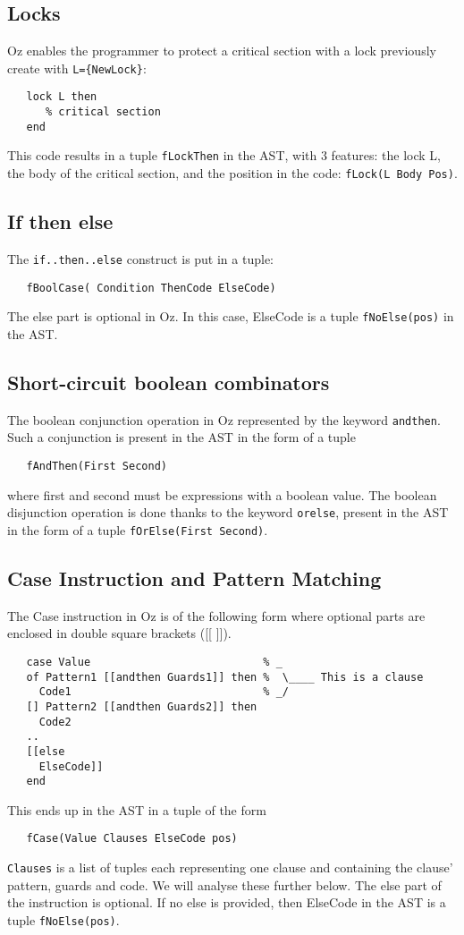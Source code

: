 \documentclass[a4paper]{memoir}
\begin{document}
\subsection{Locks}\label{sec:input:locks}
Oz enables the programmer to protect a critical section with a lock previously create with \lstinline!L={NewLock}!:
\begin{lstlisting}
   lock L then
      % critical section
   end
\end{lstlisting}

This code results in a tuple \lstinline!fLockThen! in the AST, with 3 features: the lock L,
the body of the critical section, and the position in the code:
\lstinline!fLock(L Body Pos)!.

\subsection{If then else}
The \lstinline!if..then..else! construct is put in a tuple:
\begin{lstlisting}
   fBoolCase( Condition ThenCode ElseCode)
\end{lstlisting}
The else part is optional in Oz. In this case, ElseCode is a tuple \lstinline!fNoElse(pos)! in the AST.

\subsection{Short-circuit boolean combinators}\label{sec:input:booleancombinations}
The boolean conjunction operation in Oz represented by the keyword \lstinline!andthen!. Such a conjunction is present in the AST in the form of a tuple 
\begin{lstlisting}
   fAndThen(First Second)
\end{lstlisting}
where first and second must be expressions with a boolean value.
The boolean disjunction operation is done thanks to the keyword \lstinline!orelse!, present in the AST in the form of a tuple \lstinline!fOrElse(First Second)!.

\subsection{Case Instruction and Pattern Matching}\label{sec:input:patternmatching}
The Case instruction in Oz is of the following form where optional parts are enclosed in double square brackets ([[ ]]).
\begin{lstlisting}
   case Value                           % _
   of Pattern1 [[andthen Guards1]] then %  \____ This is a clause
     Code1                              % _/
   [] Pattern2 [[andthen Guards2]] then
     Code2
   ..
   [[else
     ElseCode]]
   end
\end{lstlisting}
This ends up in the AST in a tuple of the form 
\begin{lstlisting}
   fCase(Value Clauses ElseCode pos)
\end{lstlisting}
\lstinline!Clauses! is a list of tuples each representing one clause and containing the clause' pattern, guards and code. We will analyse these further below.
The else part of the instruction is optional. If no else is provided, then ElseCode in the AST is a tuple \lstinline!fNoElse(pos)!.
\end{document}
